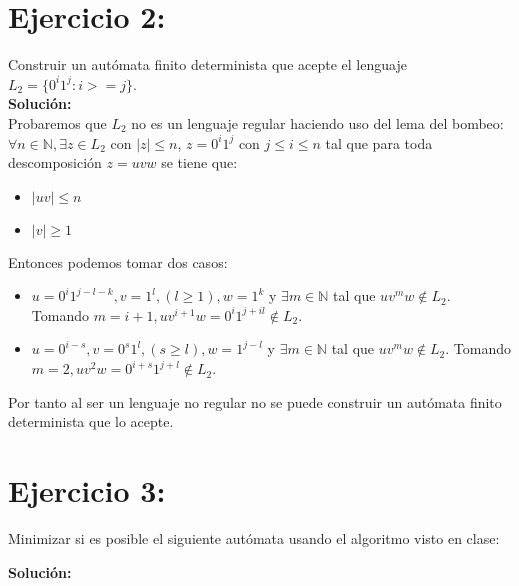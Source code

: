 \documentclass{article}
\begin{document}
\section*{Ejercicio 2:}
Construir un autómata finito determinista que acepte el lenguaje $L_2= \{0^i1^j:i>=j\}$.\\
\textbf{Solución:}\\
Probaremos que $L_2$ no es un lenguaje regular haciendo uso del lema del bombeo:
$\forall n \in \mathbb{N},  \exists z \in L_2$ con $|z| \leq n$, $z=0^i1^j$ con $j \leq i \leq n$ tal que para toda descomposición $z=uvw$ se tiene que:
\begin{itemize}
\item $|uv| \leq n$
\item $|v| \geq 1$
\end{itemize}
Entonces podemos tomar dos casos:
\begin{itemize}
\item $u=0^i1^{j-l-k}, v=1^l, (l\geq 1), w=1^k$ y $\exists m \in \mathbb{N}$ tal que $uv^mw \not\in L_2$. Tomando $m = i+1, uv^{i+1}w = 0^i1^{j+il} \not\in L_2$.
\item $u=0^{i-s}, v=0^s1^l, (s \geq l), w=1^{j-l}$ y $\exists m \in \mathbb{N}$ tal que $uv^mw \not\in L_2$. Tomando $m = 2, uv^2w = 0^{i+s}1^{j+l} \not\in L_2$.
\end{itemize} 
Por tanto al ser un lenguaje no regular no se puede construir un autómata finito determinista que lo acepte.
\section*{Ejercicio 3:}
Minimizar si es posible el siguiente autómata usando el algoritmo visto en clase:

\begin{center}
\end{center}
\textbf{Solución:}\\
\end{document}
